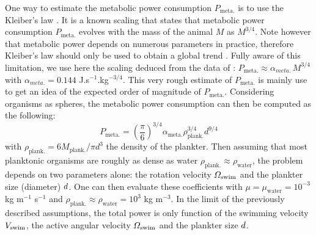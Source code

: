 One way to estimate the metabolic power consumption $P_{\mathrm{meta.}}$ is to use the Kleiber's law \citep{kleiber1961fire}.
It is a known scaling that states that metabolic power consumption $P_{\mathrm{meta.}}$ evolves with the mass of the animal $M$ as $M^{3/4}$.
Note however that metabolic power depends on numerous parameters in practice, therefore Kleiber's law should only be used to obtain a global trend \citep{glazier2005beyond}.
Fully aware of this limitation, we use here the scaling deduced from the data of \citet{gillooly2001effects}: $P_{\mathrm{meta.}} \approx \alpha_{meta.} \, M^{3/4}$ with $\alpha_{meta.} = 0.144$ J.s$^{-1}$.kg$^{-3/4}$.
This very rough estimate of $P_{\mathrm{meta.}}$ is mainly use to get an idea of the expected order of magnitude of $P_{\mathrm{meta.}}$.
Considering organisms as spheres, the metabolic power consumption can then be computed as the following:
\begin{equation}\label{eq:kleiber}
	P_{\mathrm{meta.}} = \left( \frac{\pi}{6} \right)^{3/4} \alpha_{\mathrm{meta.}} \rho_{\mathrm{plank.}}^{3/4} d^{9/4}
\end{equation}
with $\rho_{\mathrm{plank.}} = 6 M_{\mathrm{plank.}} / \pi d^3$ the density of the plankter.
Then assuming that most planktonic organisms are roughly as dense as water $\rho_{\mathrm{plank.}} \approx \rho_{\mathrm{water}}$, the problem depends on two parameters alone: the rotation velocity $\varOmega_{\mathrm{swim}}$ and the plankter size (diameter) $d$.
One can then evaluate these coefficients with $\mu = \mu_{\mathrm{water}} = 10^{-3}$ kg m$^{-1}$ s$^{-1}$ and $\rho_{\mathrm{plank.}} \approx \rho_{\mathrm{water}} = 10^{3}$ kg m$^{-3}$.
In the limit of the previously described assumptions, the total power is only function of the swimming velocity $V_{\mathrm{swim}}$, the active angular velocity $\varOmega_{\mathrm{swim}}$ and the plankter size $d$.

